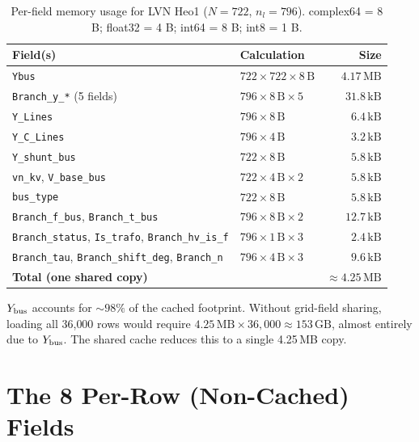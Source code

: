 \documentclass{article}
\begin{document}
\begin{table}[h]
\centering
\caption{Per-field memory usage for LVN Heo1 ($N=722$, $n_l=796$).
  complex64 = 8 B; float32 = 4 B; int64 = 8 B; int8 = 1 B.}
\label{tab:memory}
\begin{tabular}{llr}
\toprule
Field(s) & Calculation & Size \\
\midrule
\texttt{Ybus}
  & $722 \times 722 \times 8\,\mathrm{B}$
  & $\mathbf{4.17\,\mathrm{MB}}$ \\
\texttt{Branch\_y\_*} (5 fields)
  & $796 \times 8\,\mathrm{B} \times 5$
  & $31.8\,\mathrm{kB}$ \\
\texttt{Y\_Lines}
  & $796 \times 8\,\mathrm{B}$
  & $6.4\,\mathrm{kB}$ \\
\texttt{Y\_C\_Lines}
  & $796 \times 4\,\mathrm{B}$
  & $3.2\,\mathrm{kB}$ \\
\texttt{Y\_shunt\_bus}
  & $722 \times 8\,\mathrm{B}$
  & $5.8\,\mathrm{kB}$ \\
\texttt{vn\_kv}, \texttt{V\_base\_bus}
  & $722 \times 4\,\mathrm{B} \times 2$
  & $5.8\,\mathrm{kB}$ \\
\texttt{bus\_type}
  & $722 \times 8\,\mathrm{B}$
  & $5.8\,\mathrm{kB}$ \\
\texttt{Branch\_f\_bus}, \texttt{Branch\_t\_bus}
  & $796 \times 8\,\mathrm{B} \times 2$
  & $12.7\,\mathrm{kB}$ \\
\texttt{Branch\_status}, \texttt{Is\_trafo}, \texttt{Branch\_hv\_is\_f}
  & $796 \times 1\,\mathrm{B} \times 3$
  & $2.4\,\mathrm{kB}$ \\
\texttt{Branch\_tau}, \texttt{Branch\_shift\_deg}, \texttt{Branch\_n}
  & $796 \times 4\,\mathrm{B} \times 3$
  & $9.6\,\mathrm{kB}$ \\
\midrule
\textbf{Total (one shared copy)}
  & &
  $\mathbf{\approx 4.25\,\mathrm{MB}}$ \\
\bottomrule
\end{tabular}
\end{table}

$Y_{\rm bus}$ accounts for $\sim\!98\%$ of the cached footprint.
Without grid-field sharing, loading all 36{,}000 rows would require
$4.25\,\mathrm{MB} \times 36{,}000 \approx 153\,\mathrm{GB}$, almost
entirely due to $Y_{\rm bus}$.  The shared cache reduces this to a
single 4.25\,MB copy.

\section{The 8 Per-Row (Non-Cached) Fields}
\end{document}
